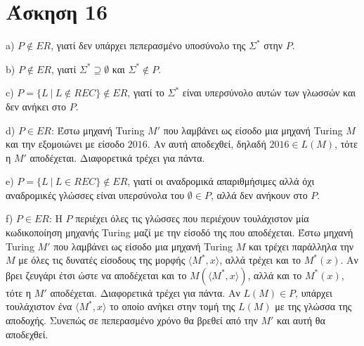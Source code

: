\documentclass[a4paper, oneside, 11pt]{article}
\theoremstyle{definition}
\begin{document}
\section*{Άσκηση 16}
a) $P\notin ER$, γιατί δεν υπάρχει πεπερασμένο υποσύνολο της $\Sigma^*$ στην $P$.

b) $P\notin ER$, γιατί $\Sigma^*\supseteq \emptyset$ και $\Sigma^*\notin P$.

c) $P=\{L\ |\ L\notin REC\}\notin ER$, γιατί το $\Sigma^*$ είναι υπερσύνολο αυτών των γλωσσών και δεν ανήκει στο $P$.

d) $P\in ER$: Έστω μηχανή Turing $M'$ που λαμβάνει ως είσοδο μια μηχανή Turing $M$ και την εξομοιώνει με είσοδο $2016$. Αν αυτή αποδεχθεί, δηλαδή $2016\in L(M)$, 
τότε η $M'$ αποδέχεται. Διαφορετικά τρέχει για πάντα.

e) $P=\{L\ |\ L\in REC\}\notin ER$, γιατί οι αναδρομικά απαριθμήσιμες αλλά όχι αναδρομικές γλώσσες είναι υπερσύνολα του $\emptyset\in P$, αλλά δεν ανήκουν στο $P$.

f) $P\in ER$: Η $P$ περιέχει όλες τις γλώσσες που περιέχουν τουλάχιστον μία κωδικοποίηση μηχανής Turing μαζί με την είσοδό της που αποδέχεται.
Έστω μηχανή Turing $Μ'$ που λαμβάνει ως είσοδο μια μηχανή Turing $M$ και τρέχει παράλληλα την $M$ με όλες τις δυνατές είσοδους της μορφής $\langle M^*, x\rangle$, αλλά τρέχει
και το $M^*(x)$. Αν βρει ζευγάρι έτσι ώστε να αποδέχεται και το $M(\langle M^*, x\rangle)$, αλλά και το $M^*(x)$, τότε η $M'$ αποδέχεται. Διαφορετικά τρέχει για πάντα.
Αν $L(M)\in P$, υπάρχει τουλάχιστον ένα $\langle M^*, x\rangle$ το οποίο ανήκει στην τομή της $L(M)$ με της γλώσσα της αποδοχής. Συνεπώς σε πεπερασμένο χρόνο θα βρεθεί από την
$M'$ και αυτή θα αποδεχθεί.
\end{document}

